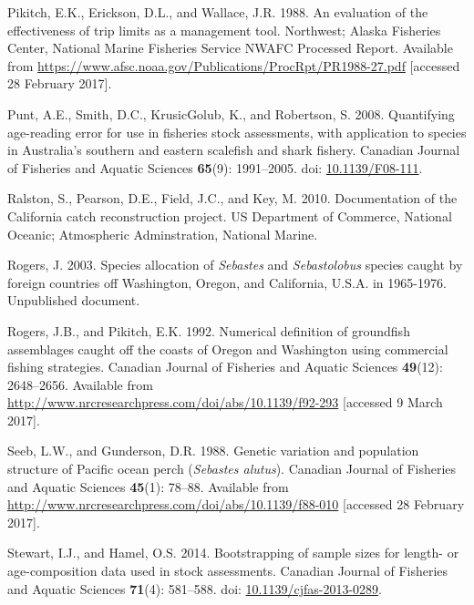 \documentclass[12pt,]{article}
\begin{document}
\hypertarget{ref-pikitch_evaluation_1988}{}
Pikitch, E.K., Erickson, D.L., and Wallace, J.R. 1988. An evaluation of
the effectiveness of trip limits as a management tool. Northwest; Alaska
Fisheries Center, National Marine Fisheries Service NWAFC Processed
Report. Available from
\url{https://www.afsc.noaa.gov/Publications/ProcRpt/PR1988-27.pdf}
{[}accessed 28 February 2017{]}.

\hypertarget{ref-punt_quantifying_2008}{}
Punt, A.E., Smith, D.C., KrusicGolub, K., and Robertson, S. 2008.
Quantifying age-reading error for use in fisheries stock assessments,
with application to species in Australia's southern and eastern
scalefish and shark fishery. Canadian Journal of Fisheries and Aquatic
Sciences \textbf{65}(9): 1991--2005. doi:
\href{https://doi.org/10.1139/F08-111}{10.1139/F08-111}.

\hypertarget{ref-ralston_documentation_2010}{}
Ralston, S., Pearson, D.E., Field, J.C., and Key, M. 2010. Documentation
of the California catch reconstruction project. US Department of
Commerce, National Oceanic; Atmospheric Adminstration, National Marine.

\hypertarget{ref-rogers_species_2003}{}
Rogers, J. 2003. Species allocation of \emph{Sebastes} and
\emph{Sebastolobus} species caught by foreign countries off Washington,
Oregon, and California, U.S.A. in 1965-1976. Unpublished document.

\hypertarget{ref-rogers_numerical_1992}{}
Rogers, J.B., and Pikitch, E.K. 1992. Numerical definition of groundfish
assemblages caught off the coasts of Oregon and Washington using
commercial fishing strategies. Canadian Journal of Fisheries and Aquatic
Sciences \textbf{49}(12): 2648--2656. Available from
\url{http://www.nrcresearchpress.com/doi/abs/10.1139/f92-293}
{[}accessed 9 March 2017{]}.

\hypertarget{ref-seeb_genetic_1988}{}
Seeb, L.W., and Gunderson, D.R. 1988. Genetic variation and population
structure of Pacific ocean perch (\emph{Sebastes alutus}). Canadian
Journal of Fisheries and Aquatic Sciences \textbf{45}(1): 78--88.
Available from
\url{http://www.nrcresearchpress.com/doi/abs/10.1139/f88-010}
{[}accessed 28 February 2017{]}.

\hypertarget{ref-stewart_bootstrapping_2014}{}
Stewart, I.J., and Hamel, O.S. 2014. Bootstrapping of sample sizes for
length- or age-composition data used in stock assessments. Canadian
Journal of Fisheries and Aquatic Sciences \textbf{71}(4): 581--588. doi:
\href{https://doi.org/10.1139/cjfas-2013-0289}{10.1139/cjfas-2013-0289}.
\end{document}
